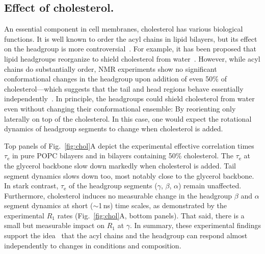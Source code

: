 \documentclass[journal=jcisd8,manuscript=article,layout=twocolumn]{achemso}
\begin{document}
\subsection*{Effect of cholesterol.}
An essential component in cell membranes, cholesterol has various biological functions.
It is well known to order the acyl chains in lipid bilayers, but
its effect on the headgroup is more controversial~\cite{huang99,ferreira13}.
For example, it has been proposed that lipid headgroups
reorganize to shield cholesterol from water~\cite{huang99}. However, while acyl chains do substantially order,
NMR experiments show no significant conformational changes in the headgroup upon addition
of even 50\% of cholesterol---which
suggests that the tail and head regions behave essentially independently~\cite{ferreira13,botan15}.
In principle, the headgroups could shield cholesterol from water even
without changing their conformational ensemble: By reorienting only laterally on
top of the cholesterol. In this case, one would expect the rotational dynamics of headgroup segments to change when cholesterol is added.

Top panels of Fig.~\ref{fig:chol}A depict the experimental effective correlation times $\tau_\mathrm e$ in pure POPC bilayers and in bilayers containing 50\% cholesterol. The $\tau_\mathrm e$ at the glycerol backbone
slow down markedly when cholesterol is added. Tail segment dynamics slows down too, most notably close to the glycerol backbone.
%
In stark contrast,
$\tau_\mathrm e$ of the headgroup segments ($\gamma$, $\beta$, $\alpha$)
remain unaffected.
%
Furthermore, cholesterol induces no measurable change in the
headgroup $\beta$ and $\alpha$ segment
dynamics at short ($\sim$1\,ns) time scales, as
demonstrated by
the experimental $R_{1}$ rates (Fig.~\ref{fig:chol}A, bottom panels).
That said,
there is a small but measurable impact on $R_1$ at $\gamma$.
%
In summary, these experimental findings
support the idea~\cite{Antila:2020a} that the acyl chains and the headgroup can respond
almost independently to changes in conditions and composition.
\end{document}
